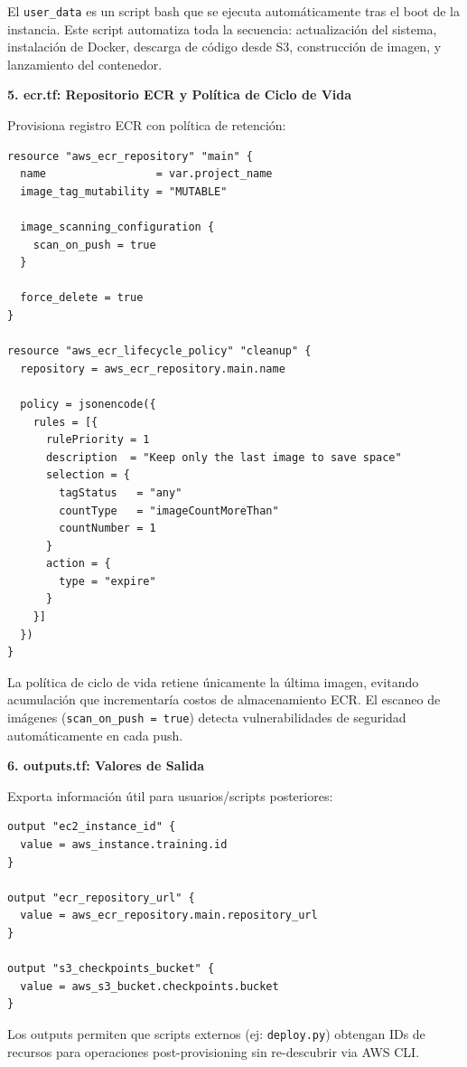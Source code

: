 El \texttt{user\_data} es un script bash que se ejecuta automáticamente tras el boot de la instancia. Este script automatiza toda la secuencia: actualización del sistema, instalación de Docker, descarga de código desde S3, construcción de imagen, y lanzamiento del contenedor.

\textbf{5. ecr.tf: Repositorio ECR y Política de Ciclo de Vida}

Provisiona registro ECR con política de retención:

\begin{lstlisting}[language=hcl, caption={ecr.tf: repositorio ECR con garbage collection}]
resource "aws_ecr_repository" "main" {
  name                 = var.project_name
  image_tag_mutability = "MUTABLE"

  image_scanning_configuration {
    scan_on_push = true
  }

  force_delete = true
}

resource "aws_ecr_lifecycle_policy" "cleanup" {
  repository = aws_ecr_repository.main.name

  policy = jsonencode({
    rules = [{
      rulePriority = 1
      description  = "Keep only the last image to save space"
      selection = {
        tagStatus   = "any"
        countType   = "imageCountMoreThan"
        countNumber = 1
      }
      action = {
        type = "expire"
      }
    }]
  })
}
\end{lstlisting}

La política de ciclo de vida retiene únicamente la última imagen, evitando acumulación que incrementaría costos de almacenamiento ECR. El escaneo de imágenes (\texttt{scan\_on\_push = true}) detecta vulnerabilidades de seguridad automáticamente en cada push.

\textbf{6. outputs.tf: Valores de Salida}

Exporta información útil para usuarios/scripts posteriores:

\begin{lstlisting}[language=hcl, caption={outputs.tf: valores exportados tras provisioning}]
output "ec2_instance_id" {
  value = aws_instance.training.id
}

output "ecr_repository_url" {
  value = aws_ecr_repository.main.repository_url
}

output "s3_checkpoints_bucket" {
  value = aws_s3_bucket.checkpoints.bucket
}
\end{lstlisting}

Los outputs permiten que scripts externos (ej: \texttt{deploy.py}) obtengan IDs de recursos para operaciones post-provisioning sin re-descubrir via AWS CLI.

